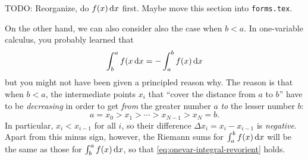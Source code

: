 \documentclass[12pt]{amsart}
\begin{document}
\begin{eg}\label{eg:onevar-linint}
  TODO: Reorganize, do $f(x)\,\dx$ first.  Maybe move this section into \texttt{forms.tex}.

  On the other hand, we can also consider also the case when $b<a$.
  In one-variable calculus, you probably learned that
  \begin{equation}\label{eq:onevar-integral-revorient}
    \itint x b a {f(x} = - \itint x a b {f(x)}
  \end{equation}
  but you might not have been given a principled reason why.
  The reason is that when $b<a$, the intermediate points $x_i$ that ``cover the distance from $a$ to $b$'' have to be \emph{decreasing} in order to get \emph{from} the greater number $a$ \emph{to} the lesser number $b$:
  \[ a = x_0 > x_1 > \cdots > x_{N-1} > x_N = b.\]
  In particular, $x_i < x_{i-1}$ for all $i$, so their difference $\Delta x_i = x_i - x_{i-1}$ is \emph{negative}.
  Apart from this minus sign, however, the Riemann sums for $\itint x a b {f(x)}$ will be the same as those for $\itint x b a {f(x)}$, so that \cref{eq:onevar-integral-revorient} holds.
\end{eg}
\end{document}
